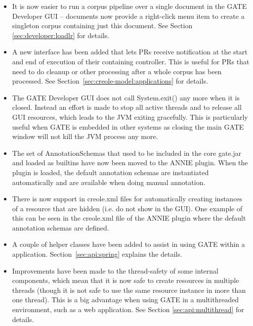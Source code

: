 \begin{itemize}
\item It is now easier to run a corpus pipeline over a single document in the
  GATE Developer GUI -- documents now provide a right-click menu item to create a
  singleton corpus containing just this document.  See Section
  \ref{sec:developer:loadlr} for details.

\item A new interface has been added that lets PRs receive notification at the
  start and end of execution of their containing controller.  This is useful
  for PRs that need to do cleanup or other processing after a whole corpus has
  been processed.  See Section~\ref{sec:creole-model:applications} for details.

\item The GATE Developer GUI does not call System.exit() any more when it is closed.
  Instead an effort is made to stop all active threads and to release all
  GUI resources, which leads to the JVM exiting gracefully. This is
  particularly useful when GATE is embedded in other systems as closing the
  main GATE window will not kill the JVM process any more.

\item The set of AnnotationSchemas that used to be included in the core
  gate.jar and loaded as builtins have now been moved to the ANNIE plugin. When
  the plugin is loaded, the default annotation schemas are instantiated
  automatically and are available when doing manual annotation.

\item There is now support in creole.xml files for automatically creating
  instances of a resource that are hidden (i.e. do not show in the GUI). One
  example of this can be seen in the creole.xml file of the ANNIE plugin where
  the default annotation schemas are defined.

\item A couple of helper classes have been added to assist in using GATE within
  a  application.
  Section~\ref{sec:api:spring} explains the details.

\item Improvements have been made to the thread-safety of some internal
  components, which mean that it is now safe to create resources in
  multiple threads (though it is not safe to use the same resource instance in
  more than one thread).  This is a big advantage when using GATE in a
  multithreaded environment, such as a web application.  See Section
  \ref{sec:api:multithread} for details.


\end{itemize}
